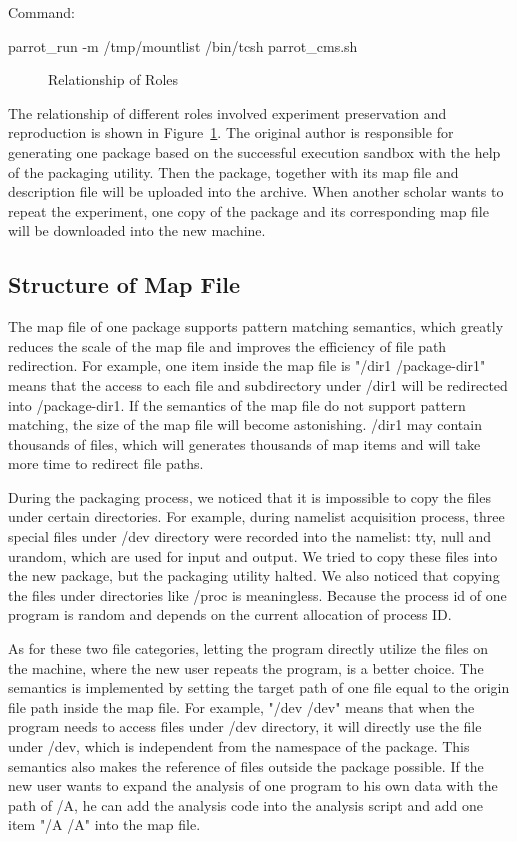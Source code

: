 \documentclass{acm_proc_article-sp}
\begin{document}
Command:

parrot\_run -m /tmp/mountlist /bin/tcsh parrot\_cms.sh

\begin{figure}
\centering
{}
\caption{Relationship of Roles}
\label{fig:solution3}
\end{figure}

The relationship of different roles involved experiment preservation and
reproduction is shown in Figure~\ref{fig:solution3}.  The original author is
responsible for generating one package based on the successful execution
sandbox with the help of the packaging utility. Then the package, together with
its map file and description file will be uploaded into the archive. When
another scholar wants to repeat the experiment, one copy of the package and its
corresponding map file will be downloaded into the new machine.

\subsection{Structure of Map File} 

The map file of one package supports pattern matching semantics,
which greatly reduces the scale of the map file and improves the efficiency of file path redirection. 
For example,
one item inside the map file is "/dir1 /package-dir1" means that the access to each file and
subdirectory under /dir1 will be redirected into /package-dir1.
If the semantics of the map file do not support pattern matching, the size of the map file will become astonishing. 
/dir1 may contain thousands of files, which will generates thousands of map items and will take more time to redirect file paths.

During the packaging process, we noticed
that it is impossible to copy the files under certain directories.
For example, during namelist acquisition process, three special files under /dev directory were recorded into the namelist: tty, null and urandom, which are used for input and output.
We tried to copy these files into the new package, but the packaging utility halted.
We also noticed that copying the files under directories like /proc is
meaningless. Because the process id of one program is random and depends on the
current allocation of process ID. 

As for these two file categories, letting
the program directly utilize the files on the machine, where the new user
repeats the program, is a better choice. The semantics is implemented by
setting the target path of one file equal to the origin file path inside the
map file. For example, "/dev /dev" means that when the program needs to access
files under /dev directory, it will directly use the file under /dev, which is
independent from the namespace of the package. This semantics also makes the
reference of files outside the package possible. If the new user wants to
expand the analysis of one program to his own data with the path of /A, he can add the analysis
code into the analysis script and add one item "/A /A" into the map file.
\end{document}
